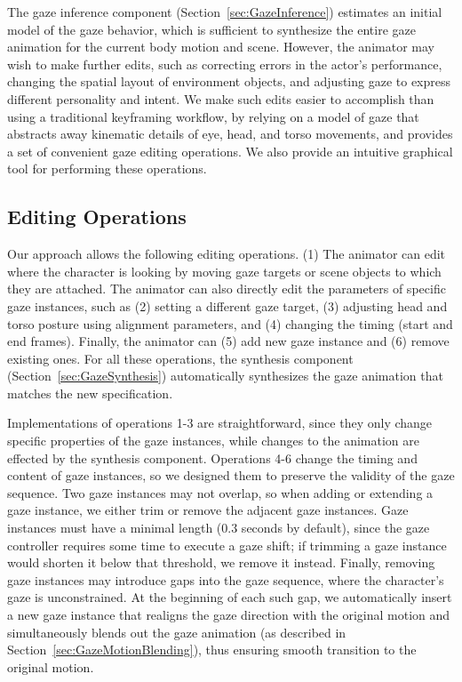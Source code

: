 The gaze inference component (Section~\ref{sec:GazeInference}) estimates an initial model of the gaze behavior, which is sufficient to synthesize the entire gaze animation for the current body motion and scene. However, the animator may wish to make further edits, such as correcting errors in the actor's performance, changing the spatial layout of environment objects, and adjusting gaze to express different personality and intent. We make such edits easier to accomplish than using a traditional keyframing workflow, by relying on a model of gaze that abstracts away kinematic details of eye, head, and torso movements, and provides a set of convenient gaze editing operations. We also provide an intuitive graphical tool for performing these operations.

\subsection{Editing Operations}

Our approach allows the following editing operations. (1) The animator can edit where the character is looking by moving gaze targets or scene objects to which they are attached. The animator can also directly edit the parameters of specific gaze instances, such as (2) setting a different gaze target, (3) adjusting head and torso posture using alignment parameters, and (4) changing the timing (start and end frames). Finally, the animator can (5) add new gaze instance and (6) remove existing ones. For all these operations, the synthesis component (Section~\ref{sec:GazeSynthesis}) automatically synthesizes the gaze animation that matches the new specification.

Implementations of operations 1-3 are straightforward, since they only change specific properties of the gaze instances, while changes to the animation are effected by the synthesis component. Operations 4-6 change the timing and content of gaze instances, so we designed them to preserve the validity of the gaze sequence. Two gaze instances may not overlap, so when adding or extending a gaze instance, we either trim or remove the adjacent gaze instances. Gaze instances must have a minimal length (0.3 seconds by default), since the gaze controller requires some time to execute a gaze shift; if trimming a gaze instance would shorten it below that threshold, we remove it instead. Finally, removing gaze instances may introduce gaps into the gaze sequence, where the character's gaze is unconstrained. At the beginning of each such gap, we automatically insert a new gaze instance that realigns the gaze direction with the original motion and simultaneously blends out the gaze animation (as described in Section~\ref{sec:GazeMotionBlending}), thus ensuring smooth transition to the original motion.

